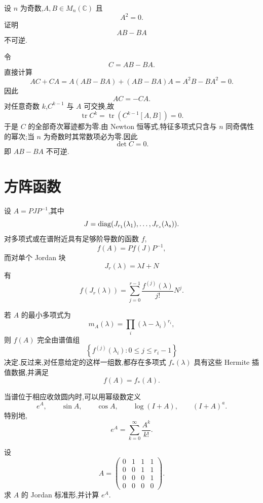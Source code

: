 \begin{example}
设 $n$ 为奇数,$A,B\in M_n(\mathbb{C})$ 且
\[
A^2=0.
\]
证明
\[
AB-BA
\]
不可逆.
\end{example}
\exampleblank

\begin{solution}
令
\[
C=AB-BA.
\]
直接计算
\[
AC+CA
=
A(AB-BA)+(AB-BA)A
=
A^2B-BA^2
=
0.
\]
因此
\[
AC=-CA.
\]
对任意奇数 $k$,$C^{k-1}$ 与 $A$ 可交换,故
\[
\operatorname{tr}C^k
=
\operatorname{tr}\left(C^{k-1}[A,B]\right)
=
0.
\]
于是 $C$ 的全部奇次幂迹都为零.由 Newton 恒等式,特征多项式只含与
$n$ 同奇偶性的幂次;当 $n$ 为奇数时其常数项必为零.因此
\[
\boxed{\det C=0}.
\]
即 $AB-BA$ 不可逆.
\end{solution}


\newpage

\section{方阵函数}

设 $A=PJP^{-1}$,其中
\[
J=\operatorname{diag}(J_{r_1}(\lambda_1),\ldots,J_{r_s}(\lambda_s)).
\]
对多项式或在谱附近具有足够阶导数的函数 $f$,
\[
f(A)=Pf(J)P^{-1},
\]
而对单个 Jordan 块
\[
J_r(\lambda)=\lambda I+N
\]
有
\[
f(J_r(\lambda))
=
\sum\limits_{j=0}^{r-1}
\dfrac{f^{(j)}(\lambda)}{j!}N^j.
\]

\begin{theorem}[\marktwostar]
若 $A$ 的最小多项式为
\[
m_A(\lambda)
=
\prod_i(\lambda-\lambda_i)^{r_i},
\]
则 $f(A)$ 完全由谱值组
\[
\left\{
f^{(j)}(\lambda_i):
0\leq j\leq r_i-1
\right\}
\]
决定.反过来,对任意给定的这样一组数,都存在多项式
$f_*(\lambda)$ 具有这些 Hermite 插值数据,并满足
\[
f(A)=f_*(A).
\]
\end{theorem}

\begin{proposition}[\markstar]
当谱位于相应收敛圆内时,可以用幂级数定义
\[
e^A,\qquad
\sin A,\qquad
\cos A,\qquad
\log(I+A),\qquad
(I+A)^a.
\]
特别地,
\[
e^A=\sum\limits_{k=0}^{\infty}\dfrac{A^k}{k!}.
\]
\end{proposition}


\begin{example}
设
\[
A=
\begin{pmatrix}
0&1&1&1\\
0&0&1&1\\
0&0&0&1\\
0&0&0&0
\end{pmatrix}.
\]
求 $A$ 的 Jordan 标准形,并计算 $e^A$.
\end{example}
\exampleblank

